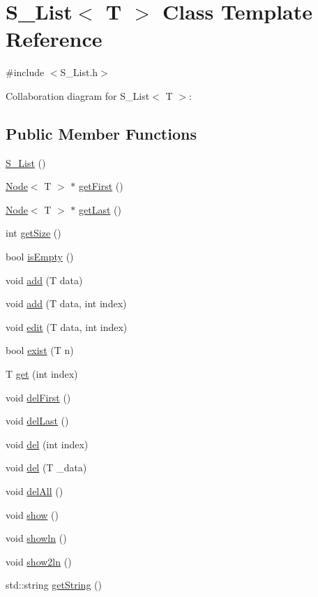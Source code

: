 \hypertarget{classS__List}{}\section{S\+\_\+\+List$<$ T $>$ Class Template Reference}
\label{classS__List}


{\ttfamily \#include $<$S\+\_\+\+List.\+h$>$}



Collaboration diagram for S\+\_\+\+List$<$ T $>$\+:
\subsection*{Public Member Functions}
\begin{DoxyCompactItemize}
\item 
\hyperlink{classS__List_ac5a524eb1b1450c46573d2ecb805231b}{S\+\_\+\+List} ()
\item 
\hyperlink{classNode}{Node}$<$ T $>$ $\ast$ \hyperlink{classS__List_adf77c59b93bf3143085e1ee9e177ab24}{get\+First} ()
\item 
\hyperlink{classNode}{Node}$<$ T $>$ $\ast$ \hyperlink{classS__List_afa8690865927d7524b73695f52fbf64f}{get\+Last} ()
\item 
int \hyperlink{classS__List_a0f77fdfb8aba97c6c8c76e333e5be1f7}{get\+Size} ()
\item 
bool \hyperlink{classS__List_a151b22dfc6f5a27a7cada5f690c575ae}{is\+Empty} ()
\item 
void \hyperlink{classS__List_a4f7470a1fcd9194d4f6e288eb78b216e}{add} (T data)
\item 
void \hyperlink{classS__List_a478ebbea3bc181d5ecba4455f821e016}{add} (T data, int index)
\item 
void \hyperlink{classS__List_a0261777964783986a4178b91bab9827b}{edit} (T data, int index)
\item 
bool \hyperlink{classS__List_a9bd0b6ba960a9e4b2aad0140620d5413}{exist} (T n)
\item 
T \hyperlink{classS__List_a9a10fdb609a9ba2858b56563b4fbbae2}{get} (int index)
\item 
void \hyperlink{classS__List_aea99b3adf10b66184acf2441377c640b}{del\+First} ()
\item 
void \hyperlink{classS__List_abd62cb0e217f9c5c3bb735842e78abd9}{del\+Last} ()
\item 
void \hyperlink{classS__List_afc57146fd54607be1f8a23bd14ad4a41}{del} (int index)
\item 
void \hyperlink{classS__List_ab7aa70c87ffeaa60e7e909aed78c64d8}{del} (T \+\_\+data)
\item 
void \hyperlink{classS__List_aefc5209c854aeb3d6630561a2d4a047f}{del\+All} ()
\item 
void \hyperlink{classS__List_a55c3046c5a69f8d02f9142f4b1e37220}{show} ()
\item 
void \hyperlink{classS__List_ad8fbbf6cd698a6c8dbaaa1a32208b2e2}{showln} ()
\item 
void \hyperlink{classS__List_a5b949c6b65d876ff9af994d9382ed188}{show2ln} ()
\item 
std\+::string \hyperlink{classS__List_af16dbe30d56a18448001355a137a9c45}{get\+String} ()
\end{DoxyCompactItemize}
